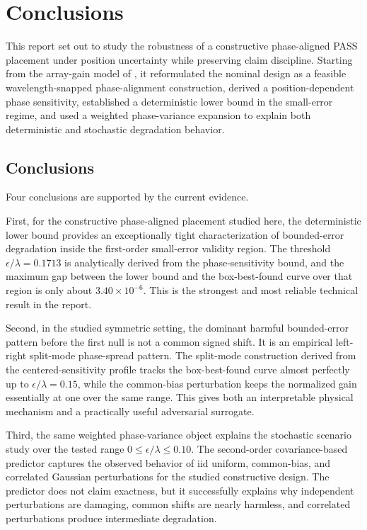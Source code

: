 \section{Conclusions}

This report set out to study the robustness of a constructive phase-aligned PASS placement under position uncertainty while preserving claim discipline. Starting from the array-gain model of \cite{ouyang2025array}, it reformulated the nominal design as a feasible wavelength-snapped phase-alignment construction, derived a position-dependent phase sensitivity, established a deterministic lower bound in the small-error regime, and used a weighted phase-variance expansion to explain both deterministic and stochastic degradation behavior.

\subsection{Conclusions}

Four conclusions are supported by the current evidence.

First, for the constructive phase-aligned placement studied here, the deterministic lower bound provides an exceptionally tight characterization of bounded-error degradation inside the first-order small-error validity region. The threshold $\epsilon/\lambda = 0.1713$ is analytically derived from the phase-sensitivity bound, and the maximum gap between the lower bound and the box-best-found curve over that region is only about $3.40 \times 10^{-6}$. This is the strongest and most reliable technical result in the report.

Second, in the studied symmetric setting, the dominant harmful bounded-error pattern before the first null is not a common signed shift. It is an empirical left-right split-mode phase-spread pattern. The split-mode construction derived from the centered-sensitivity profile tracks the box-best-found curve almost perfectly up to $\epsilon/\lambda = 0.15$, while the common-bias perturbation keeps the normalized gain essentially at one over the same range. This gives both an interpretable physical mechanism and a practically useful adversarial surrogate.

Third, the same weighted phase-variance object explains the stochastic scenario study over the tested range $0 \le \epsilon/\lambda \le 0.10$. The second-order covariance-based predictor captures the observed behavior of iid uniform, common-bias, and correlated Gaussian perturbations for the studied constructive design. The predictor does not claim exactness, but it successfully explains why independent perturbations are damaging, common shifts are nearly harmless, and correlated perturbations produce intermediate degradation.

